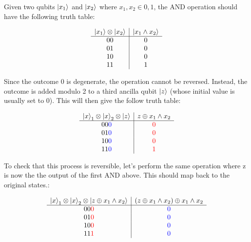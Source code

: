 Given two qubits $\left\vert{x_1}\right\rangle$ and $\left\vert{x_2}\right\rangle$ where $x_1, x_2\in {0,1}$, the AND operation should have the following truth table:

\begin{equation}
\begin{array}{c|c}
    \left\vert{x_1}\right\rangle \otimes \left\vert{x_2}\right\rangle & \left\vert{x_1\wedge x_2}\right\rangle \\
    \hline
    00 & 0 \\
    01 & 0 \\
    10 & 0 \\
    11 & 1 \\
\end{array}
\end{equation}

Since the outcome 0 is degenerate, the operation cannot be reversed. Instead, the outcome is added modulo 2 to a third ancilla qubit $\left\vert{z}\right\rangle$ (whose initial value is usually set to 0). This will then give the follow truth table:

\begin{equation}
\begin{array}{c|c}
    \left\vert{x}\right\rangle_1 \otimes \left\vert{x}\right\rangle_2 \otimes \left\vert{z}\right\rangle & z \oplus x_1\wedge x_2 \\
    \hline
    00\textcolor{blue}{0} & \textcolor{red}{0} \\
    01\textcolor{blue}{0} & \textcolor{red}{0} \\
    10\textcolor{blue}{0} & \textcolor{red}{0} \\
    11\textcolor{blue}{0} & \textcolor{red}{1} \\
\end{array}
\end{equation}

To check that this process is reversible, let's perform the same operation where z is now the the output of the first AND above. This should map back to the original  states.:

\begin{equation}
\begin{array}{c|c}
    \left\vert{x}\right\rangle_1 \otimes \left\vert{x}\right\rangle_2 \otimes \left\vert{z \oplus x_1\wedge x_2}\right\rangle & (z \oplus x_1\wedge x_2) \oplus x_1\wedge x_2 \\
    \hline
    00\textcolor{red}{0} & \textcolor{blue}{0} \\
    01\textcolor{red}{0} & \textcolor{blue}{0} \\
    10\textcolor{red}{0} & \textcolor{blue}{0} \\
    11\textcolor{red}{1} & \textcolor{blue}{0} \\
\end{array}
\end{equation}


